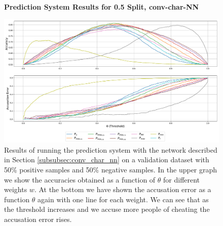 \begin{figure}
    \centering
    \textbf{Prediction System Results for 0.5 Split, \glsdesc{conv-char-NN}}\par\medskip
    \includegraphics[scale=0.33]{./pictures/experiments/conv_char_nn/prediction_system_50}
    \caption{Results of running the prediction system with the network described
        in Section \ref{subsubsec:conv_char_nn} on a validation dataset with
        50\% positive samples and 50\% negative samples. In the upper graph we
        show the accuracies obtained as a function of $\theta$ for different
        weights $w$. At the bottom we have shown the accusation error as a
        function $\theta$ again with one line for each weight. We can see that
        as the threshold increases and we accuse more people of cheating the
        accusation error rises.}
    \label{fig:conv-char-NN-pred-50}
\end{figure}

